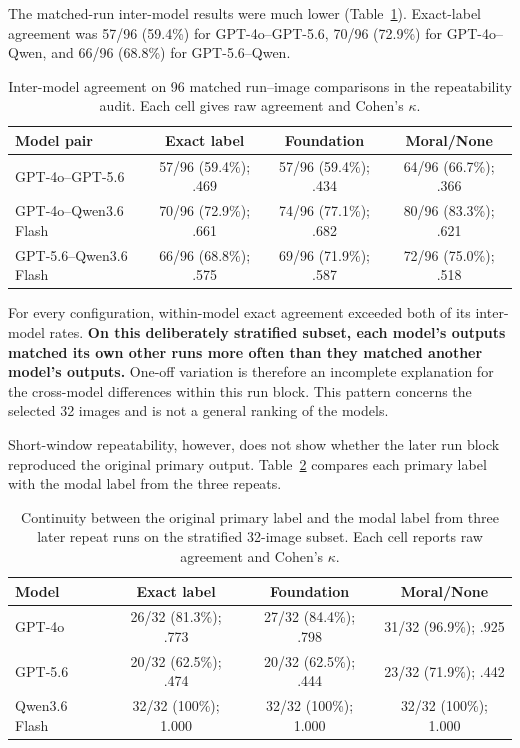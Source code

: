 The matched-run inter-model results were much lower
(Table~\ref{tab:repeat_inter_model}). Exact-label agreement was 57/96 (59.4\%)
for GPT-4o--GPT-5.6, 70/96 (72.9\%) for GPT-4o--Qwen, and 66/96 (68.8\%) for
GPT-5.6--Qwen.

\begin{table}[!htbp]
    \centering
    \caption{Inter-model agreement on 96 matched run--image comparisons in the
    repeatability audit. Each cell gives raw agreement and Cohen's \(\kappa\).}
    \label{tab:repeat_inter_model}
    \small
    \begin{tabular}{lccc}
        \toprule
        Model pair & Exact label & Foundation & Moral/None \\
        \midrule
        GPT-4o--GPT-5.6 & 57/96 (59.4\%); .469 &
        57/96 (59.4\%); .434 & 64/96 (66.7\%); .366 \\
        GPT-4o--Qwen3.6 Flash & 70/96 (72.9\%); .661 &
        74/96 (77.1\%); .682 & 80/96 (83.3\%); .621 \\
        GPT-5.6--Qwen3.6 Flash & 66/96 (68.8\%); .575 &
        69/96 (71.9\%); .587 & 72/96 (75.0\%); .518 \\
        \bottomrule
    \end{tabular}
\end{table}

For every configuration, within-model exact agreement exceeded both of its
inter-model rates. \textbf{On this deliberately stratified subset, each model's
outputs matched its own other runs more often than they matched another
model's outputs.} One-off variation is therefore an incomplete explanation for
the cross-model differences within this run block. This pattern concerns the
selected 32 images and is not a general ranking of the models.

Short-window repeatability, however, does not show whether the later run block
reproduced the original primary output. Table~\ref{tab:primary_repeat_continuity}
compares each primary label with the modal label from the three repeats.

\begin{table}[!htbp]
    \centering
    \caption{Continuity between the original primary label and the modal label
    from three later repeat runs on the stratified 32-image subset. Each cell
    reports raw agreement and Cohen's \(\kappa\).}
    \label{tab:primary_repeat_continuity}
    \small
    \begin{tabular}{lccc}
        \toprule
        Model & Exact label & Foundation & Moral/None \\
        \midrule
        GPT-4o & 26/32 (81.3\%); .773 & 27/32 (84.4\%); .798 &
        31/32 (96.9\%); .925 \\
        GPT-5.6 & 20/32 (62.5\%); .474 & 20/32 (62.5\%); .444 &
        23/32 (71.9\%); .442 \\
        Qwen3.6 Flash & 32/32 (100\%); 1.000 & 32/32 (100\%); 1.000 &
        32/32 (100\%); 1.000 \\
        \bottomrule
    \end{tabular}
\end{table}

